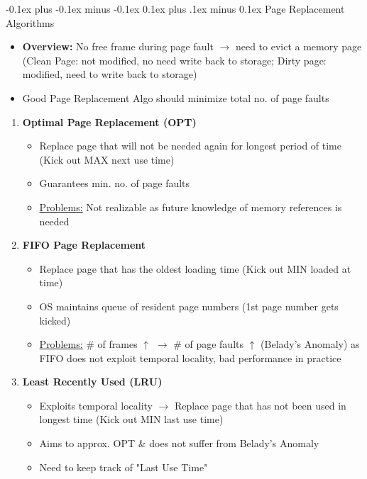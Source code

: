 \documentclass[landscape]{article}
\makeatletter
\renewcommand{\subsection}{\@startsection{subsection}{2}{0mm}%
  {-0.1ex plus -0.1ex minus -0.1ex}%
  {0.1ex plus .1ex minus 0.1ex}%
{\normalfont\scriptsize\bfseries}}
\makeatother
\begin{document}
\begin{multicols*}{6}
    \subsection{Page Replacement Algorithms}
    \begin{itemize}
      \item \textbf{Overview:} No free frame during page fault $\rightarrow$ need to evict a memory page (Clean Page: not modified, no need write back to storage; Dirty page: modified, need to write back to storage)
      \item Good Page Replacement Algo should minimize total no. of page faults
    \end{itemize}
    \begin{enumerate}
      \item \textbf{Optimal Page Replacement (OPT)}
      \begin{itemize}
        \item Replace page that will not be needed again for longest period of time (Kick out MAX next use time)
        \item Guarantees min. no. of page faults
        \item \underline{Problems:} Not realizable as future knowledge of memory references is needed
      \end{itemize}
      \item \textbf{FIFO Page Replacement}
      \begin{itemize}
        \item Replace page that has the oldest loading time (Kick out MIN loaded at time)
        \item OS maintains queue of resident page numbers (1st page number gets kicked)
        \item \underline{Problems:} \# of frames $\uparrow$ $\rightarrow$ \# of page faults $\uparrow$ (Belady's Anomaly) as FIFO does not exploit temporal locality, bad performance in practice
      \end{itemize}
      \item \textbf{Least Recently Used (LRU)}
      \begin{itemize}
        \item Exploits temporal locality $\rightarrow$ Replace page that has not been used in longest time (Kick out MIN last use time)
        \item Aims to approx. OPT \& does not suffer from Belady's Anomaly
        \item Need to keep track of "Last Use Time"
          \begin{itemize}

\end{itemize}
\end{itemize}
\end{enumerate}
\end{multicols*}
\end{document}
